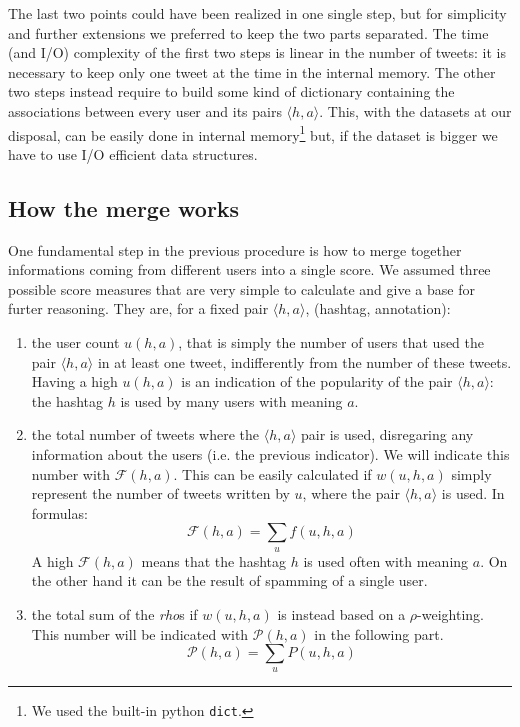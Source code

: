 \documentclass[a4paper,11pt,oneside]{article}
\newcommand{\ha}{$\langle h,a \rangle$\xspace}
\begin{document}
The last two points could have been realized in one single step, but for simplicity and further extensions we preferred to keep the two parts separated. The time (and I/O) complexity of the first two steps is linear in the number of tweets: it is necessary to keep only one tweet at the time in the internal memory. 
The other two steps instead require to build some kind of dictionary containing the associations between every user and its pairs \ha. This, with the datasets at our disposal, can be easily done in internal memory\footnote{We used the built-in python \texttt{dict}.} but, if the dataset is bigger we have to use I/O efficient data structures.


\subsection{How the merge works}
\label{sec:merge}
One fundamental step in the previous procedure is how to merge together informations coming from different users into a single score. We assumed three possible score measures that are very simple to calculate and give a base for furter reasoning. They are, for a fixed pair $\langle h,a \rangle$, (hashtag, annotation):
\begin{enumerate}
\item the user count $u(h,a)$, that is simply the number of users that used the pair $\langle h,a \rangle$ in at least one tweet, indifferently from the number of these tweets. Having a high $u(h,a)$ is an indication of the popularity of the pair $\langle h,a \rangle$: the hashtag $h$ is used by many users with meaning $a$.

\item the total number of tweets where the $\langle h,a \rangle$ pair is used, disregaring any information about the users (i.e. the previous indicator). We will indicate this number with $\mathcal{F}(h,a)$. This can be easily calculated if $w(u,h,a)$ simply represent the number of tweets written by $u$, where the pair $\langle h,a \rangle$ is used. In formulas:
\begin{equation}
\label{eqn:frequency}
\mathcal{F}(h,a) = \sum_{u} f(u,h,a)
\end{equation}
A high $\mathcal{F}(h,a)$ means that the hashtag $h$ is used often with meaning $a$. On the other hand it can be the result of spamming of a single user.

\item the total sum of the \textit{rho}s if $w(u,h,a)$ is instead based on a $\rho$-weighting. This number will be indicated with $\mathcal{P}(h,a)$ in the following part.
\begin{equation}
\mathcal{P}(h,a) = \sum_{u} P(u,h,a)
\end{equation}
\end{enumerate}
\end{document}
